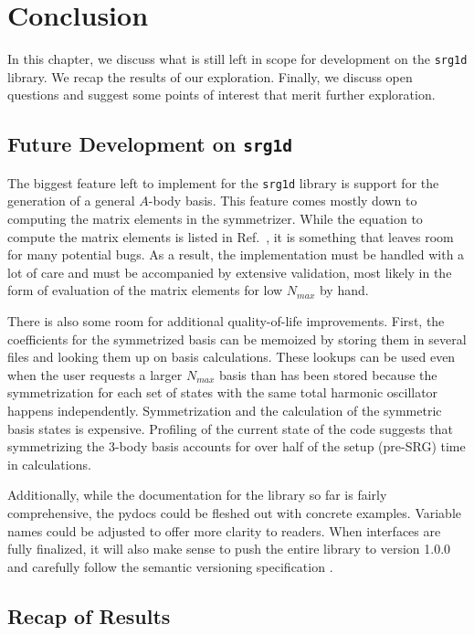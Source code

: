 \chapter{Conclusion}\label{conclusion}

In this chapter, we discuss what is still left in scope for development on the \texttt{srg1d} library. We recap the results of our exploration. Finally, we discuss open questions and suggest some points of interest that merit further exploration.

\section{Future Development on \texttt{srg1d}}

The biggest feature left to implement for the \texttt{srg1d} library is support for the generation of a general $A$-body basis. This feature comes mostly down to computing the matrix elements in the symmetrizer. While the equation to compute the matrix elements is listed in Ref.~\cite{Jurgenson:2008jp}, it is something that leaves room for many potential bugs. As a result, the implementation must be handled with a lot of care and must be accompanied by extensive validation, most likely in the form of evaluation of the matrix elements for low $N_{max}$ by hand.

There is also some room for additional quality-of-life improvements. First, the coefficients for the symmetrized basis can be memoized by storing them in several files and looking them up on basis calculations. These lookups can be used even when the user requests a larger $N_{max}$ basis than has been stored because the symmetrization for each set of states with the same total harmonic oscillator happens independently. Symmetrization and the calculation of the symmetric basis states is expensive. Profiling of the current state of the code suggests that symmetrizing the 3-body basis accounts for over half of the setup (pre-SRG) time in calculations.

Additionally, while the documentation for the library so far is fairly comprehensive, the pydocs could be fleshed out with concrete examples. Variable names could be adjusted to offer more clarity to readers. When interfaces are fully finalized, it will also make sense to push the entire library to version 1.0.0 and carefully follow the semantic versioning specification \cite{semver}.

\section{Recap of Results}

